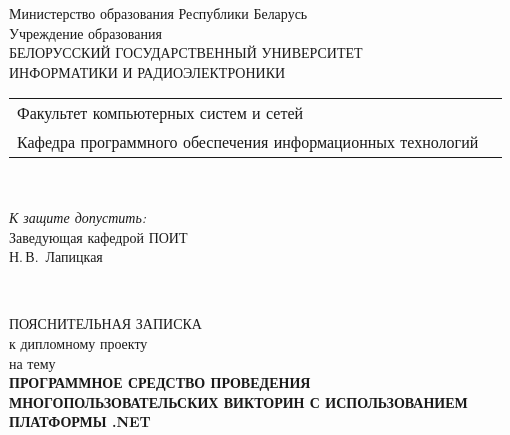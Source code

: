 \begin{titlepage}
  \begin{center}
    Министерство образования Республики Беларусь\\[1em]
    Учреждение образования\\
    БЕЛОРУССКИЙ ГОСУДАРСТВЕННЫЙ УНИВЕРСИТЕТ \\
    ИНФОРМАТИКИ И РАДИОЭЛЕКТРОНИКИ\\[1em]

    \begin{minipage}{\textwidth}
      \begin{flushleft}
        \begin{tabular}{ l l }
          Факультет компьютерных систем и сетей\\[1em]
          Кафедра программного обеспечения информационных технологий
        \end{tabular}
      \end{flushleft}
    \end{minipage}\\[2em]


    \begin{flushright}
      \begin{minipage}{0.4\textwidth}
        \textit{К защите допустить:}\\[0.8em]
        Заведующая кафедрой ПОИТ\\[0.45em]
        \underline{\hspace*{2.8cm}} Н.\,В.~Лапицкая
      \end{minipage}\\[2.2em]
    \end{flushright}

    {ПОЯСНИТЕЛЬНАЯ ЗАПИСКА}\\
    {к дипломному проекту}\\
    {на тему}\\[1em]
    \textbf{\MakeUppercase{ПРОГРАММНОЕ СРЕДСТВО ПРОВЕДЕНИЯ МНОГОПОЛЬЗОВАТЕЛЬСКИХ ВИКТОРИН С ИСПОЛЬЗОВАНИЕМ ПЛАТФОРМЫ .NET}}\\[1em]



\end{center}
\end{titlepage}
